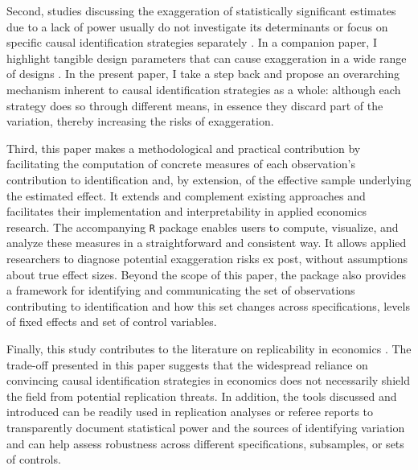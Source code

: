 			Second, studies discussing the exaggeration of statistically significant estimates due to a lack of power usually do not investigate its determinants or focus on specific causal identification strategies separately \citep{ioannidis_power_2017, schellEvaluatingMethodsEstimate2018, ferraro_featureis_2020, black_simulated_2022, stommesReliability2023, arel-bundockQuantitativePoliticalScience2022}. In a companion paper, I highlight tangible design parameters that can cause exaggeration in a wide range of designs \citep{bagilet_accurate_2023}. In the present paper, I take a step back and propose an overarching mechanism inherent to causal identification strategies as a whole: although each strategy does so through different means, in essence they discard part of the variation, thereby increasing the risks of exaggeration.
			
			Third, this paper makes a methodological and practical contribution by facilitating the computation of concrete measures of each observation’s contribution to identification and, by extension, of the effective sample underlying the estimated effect. It extends and complement existing approaches \citep{angrist_mostly_2009, aronow_does_2016} and facilitates their implementation and interpretability in applied economics research. %
			The accompanying \verb?R? package enables users to compute, visualize, and analyze these measures in a straightforward and consistent way. It allows applied researchers to diagnose potential exaggeration risks ex post, without assumptions about true effect sizes. Beyond the scope of this paper, the package also provides a framework for identifying and communicating the set of observations contributing to identification and how this set changes across specifications, levels of fixed effects and set of control variables.
			
			Finally, this study contributes to the literature on replicability in economics \citep{camerer_evaluating_2016, ioannidis_power_2017, christensen_transparency_2018, kasy_forking_2021}. The trade-off presented in this paper suggests that the widespread reliance on convincing causal identification strategies in economics does not necessarily shield the field from potential replication threats. In addition, the tools discussed and introduced can be readily used in replication analyses or referee reports to transparently document statistical power and the sources of identifying variation and can help assess robustness across different specifications, subsamples, or sets of controls.
			

